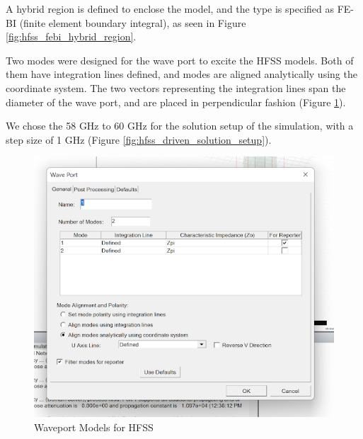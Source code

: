 \documentclass[a4paper,12pt]{report}
\begin{document}
A hybrid region is defined to enclose the model,
and the type is specified as FE-BI (finite element boundary integral),
as seen in Figure \ref{fig:hfss_febi_hybrid_region}.

Two modes were designed for the wave port to excite the HFSS models.
Both of them have integration lines defined,
and modes are aligned analytically using the coordinate system.
The two vectors representing the 
integration lines span the diameter of the wave port,
and are placed in perpendicular fashion (Figure \ref{fig:hfss_waveport_modes}).

We chose the 58 GHz to 60 GHz for the solution setup of the simulation,
with a step size of 1 GHz (Figure \ref{fig:hfss_driven_solution_setup}).

\begin{figure}
  \centering
  \begin{minipage}{0.45\textwidth}
    \centering
    \includegraphics[clip, keepaspectratio, width=0.9\linewidth]{img/hfss_waveport_modes.png}
    \caption{Waveport Models for HFSS}
    \label{fig:hfss_waveport_modes}
  \end{minipage}\hfill
  \begin{minipage}{0.45\textwidth}
    \centering

\end{minipage}
\end{figure}
\end{document}

